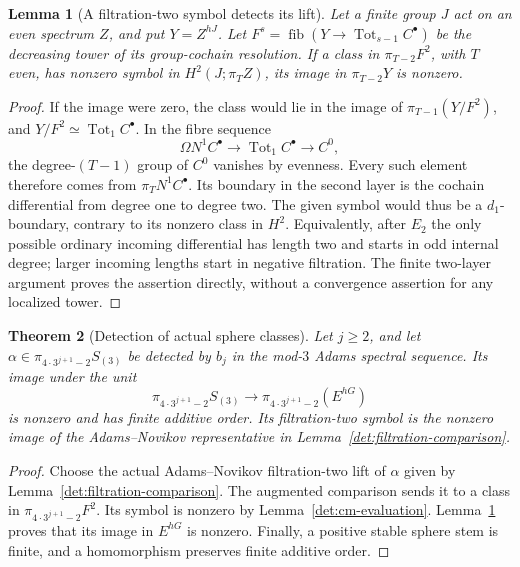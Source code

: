 \documentclass[11pt]{article}
\newtheorem{theorem}{Theorem}[section]
\newtheorem{lemma}[theorem]{Lemma}
\theoremstyle{definition}
\theoremstyle{remark}
\numberwithin{equation}{section}
\begin{document}
\begin{lemma}[A filtration-two symbol detects its lift]
\label{det:two-layer}
Let a finite group \(J\) act on an even spectrum \(Z\), and put
\(Y=Z^{hJ}\).
Let \(F^s=\operatorname{fib}(Y\to\operatorname{Tot}_{s-1}C^\bullet)\)
be the decreasing tower of its group-cochain resolution.
If a class in \(\pi_{T-2}F^2\), with \(T\) even, has nonzero
symbol in \(H^2(J;\pi_T Z)\), its image in \(\pi_{T-2}Y\)
is nonzero.
\end{lemma}

\begin{proof}
If the image were zero, the class would lie in the image of
\(\pi_{T-1}(Y/F^2)\), and \(Y/F^2\simeq\operatorname{Tot}_1C^\bullet\).
In the fibre sequence
\[
 \Omega N^1C^\bullet\longrightarrow
 \operatorname{Tot}_1C^\bullet\longrightarrow C^0,
\]
the degree-\((T-1)\) group of \(C^0\) vanishes by evenness.
Every such element therefore comes from
\(\pi_T N^1C^\bullet\).
Its boundary in the second layer is the cochain differential
from degree one to degree two.  The given symbol would thus
be a \(d_1\)-boundary, contrary to its nonzero class in
\(H^2\).
Equivalently, after \(E_2\) the only possible ordinary incoming
differential has length two and starts in odd internal degree;
larger incoming lengths start in negative filtration.
The finite two-layer argument proves the assertion directly,
without a convergence assertion for any localized tower.
\end{proof}

\begin{theorem}[Detection of actual sphere classes]
\label{det:actual-detector}
Let \(j\geq2\), and let
\(\alpha\in\pi_{4\cdot3^{j+1}-2}S_{(3)}\) be detected by
\(b_j\) in the mod-\(3\) Adams spectral sequence.
Its image under the unit
\[
 \pi_{4\cdot3^{j+1}-2}S_{(3)}
 \longrightarrow
 \pi_{4\cdot3^{j+1}-2}(E^{hG})
\]
is nonzero and has finite additive order.
Its filtration-two symbol is the nonzero image of the
Adams--Novikov representative in
Lemma~\ref{det:filtration-comparison}.
\end{theorem}

\begin{proof}
Choose the actual Adams--Novikov filtration-two lift of
\(\alpha\) given by Lemma~\ref{det:filtration-comparison}.
The augmented comparison sends it to a class in
\(\pi_{4\cdot3^{j+1}-2}F^2\).
Its symbol is nonzero by Lemma~\ref{det:cm-evaluation}.
Lemma~\ref{det:two-layer} proves that its image in
\(E^{hG}\) is nonzero.
Finally, a positive stable sphere stem is finite, and a
homomorphism preserves finite additive order.
\end{proof}
\end{document}
